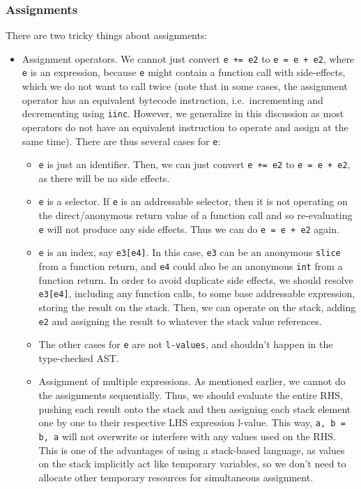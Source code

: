 \documentclass[11pt]{article}
\begin{document}
\subsubsection{Assignments}
There are two tricky things about assignments:
\begin{itemize}[noitemsep]
\item Assignment operators. We cannot just convert \texttt{e += e2} to
  \texttt{e = e + e2}, where \texttt{e} is an expression, because
  \texttt{e} might contain a function call with side-effects, which we
  do not want to call twice (note that in some cases, the assignment
  operator has an equivalent bytecode instruction, i.e.\ incrementing
  and decrementing using \texttt{iinc}. However, we generalize in this
  discussion as most operators do not have an equivalent instruction
  to operate and assign at the same time). There are thus several
  cases for \texttt{e}:
  \begin{itemize}[noitemsep]
  \item \texttt{e} is just an identifier. Then, we can just convert
    \texttt{e += e2} to \texttt{e = e + e2}, as there will be no side
    effects.
  \item \texttt{e} is a selector. If \texttt{e} is an addressable
    selector, then it is not operating on the direct/anonymous return
    value of a function call and so re-evaluating \texttt{e} will not
    produce any side effects. Thus we can do \texttt{e = e + e2}
    again.
  \item \texttt{e} is an index, say \texttt{e3[e4]}. In this case,
    \texttt{e3} can be an anonymous \texttt{slice} from a function
    return, and \texttt{e4} could also be an anonymous \texttt{int}
    from a function return. In order to avoid duplicate side effects,
    we should resolve \texttt{e3[e4]}, including any function calls,
    to some base addressable expression, storing the result on the
    stack. Then, we can operate on the stack, adding \texttt{e2} and
    assigning the result to whatever the stack value references.
  \item The other cases for \texttt{e} are not \texttt{l-values}, and
    shouldn't happen in the type-checked AST.\@
  \end{itemize}
  \begin{itemize}
  \item Assignment of multiple expressions. As mentioned earlier, we
    cannot do the assignments sequentially. Thus, we should evaluate
    the entire RHS, pushing each result onto the stack and then
    assigning each stack element one by one to their respective LHS
    expression l-value. This way, \texttt{a, b = b, a} will not
    overwrite or interfere with any values used on the RHS. This is
    one of the advantages of using a stack-based language, as values
    on the stack implicitly act like temporary variables, so we don't
    need to allocate other temporary resources for simultaneous
    assignment.
  \end{itemize}
\end{itemize}
\end{document}

